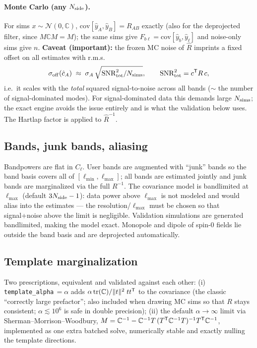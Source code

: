 \documentclass[11pt,a4paper]{article}
\newcommand{\C}{\mathbb{C}}
\begin{document}
\paragraph{Monte Carlo (any $N_{\rm side}$).}  For sims
$x\sim\mathcal N(0,\C)$, $\mathrm{cov}[\hat y_A,\hat y_B] = R_{AB}$
exactly (also for the deprojected filter, since $M\C M = M$); the same sims
give $F_{b\ell}=\mathrm{cov}[\hat y_b, \hat y_\ell]$ and noise-only sims
give $n$.  \textbf{Caveat (important):} the frozen MC noise of $\hat R$
imprints a fixed offset on all estimates with r.m.s.
\begin{equation}
  \sigma_{\rm off}(\hat c_A) \;\approx\; \sigma_A\,
  \sqrt{\mathrm{SNR}^2_{\rm tot}/N_{\rm sims}},
  \qquad \mathrm{SNR}^2_{\rm tot} = c^{\sf T} R\, c,
\end{equation}
i.e.\ it scales with the \emph{total} squared signal-to-noise across all
bands ($\sim$ the number of signal-dominated modes).  For signal-dominated
data this demands large $N_{\rm sims}$; the exact engine avoids the issue
entirely and is what the validation below uses.  The Hartlap factor is
applied to $\hat R^{-1}$.

\subsection{Bands, junk bands, aliasing}
Bandpowers are flat in $C_\ell$.  User bands are augmented with ``junk''
bands so the band basis covers all of $[\ell_{\min},\ell_{\max}]$; all bands
are estimated jointly and junk bands are marginalized via the full
$R^{-1}$.  The covariance model is bandlimited at $\ell_{\max}$ (default
$3N_{\rm side}-1$): data power above $\ell_{\max}$ is not modeled and would
alias into the estimates --- the resolution/$\ell_{\max}$ must be chosen so
that signal+noise above the limit is negligible.  Validation simulations are
generated bandlimited, making the model exact.  Monopole and dipole of
spin-0 fields lie outside the band basis and are deprojected automatically.

\subsection{Template marginalization}
\label{sec:templates}
Two prescriptions, equivalent and validated against each other:
(i) \texttt{template\_alpha}$\,=\alpha$ adds
$\alpha\,\mathrm{tr}(\C)/\lVert t\rVert^2\; t t^{\sf T}$ to the covariance
(the classic ``correctly large prefactor''; also included when drawing MC
sims so that $R$ stays consistent; $\alpha\lesssim10^6$ is safe in double
precision); (ii) the default $\alpha\to\infty$ limit via
Sherman--Morrison--Woodbury,
$M = \C^{-1} - \C^{-1}T\,(T^{\sf T}\C^{-1}T)^{-1}T^{\sf T}\C^{-1}$,
implemented as one extra batched solve, numerically stable and exactly
nulling the template directions.
\end{document}
